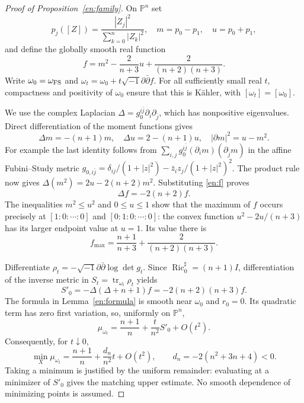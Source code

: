 \documentclass[12pt]{amsart}
\theoremstyle{definition}
\theoremstyle{remark}
\numberwithin{equation}{section}
\DeclareMathOperator{\Ric}{Ric}
\DeclareMathOperator{\tr}{tr}
\theoremstyle{plain}
\theoremstyle{remark}
\theoremstyle{definition}
\begin{document}
\begin{proof}[Proof of Proposition~\ref{en:family}]
On $\mathbb P^n$ set
\[
 p_j([Z])=\frac{|Z_j|^2}{\sum_{k=0}^n|Z_k|^2},\quad
 m=p_0-p_1,\quad u=p_0+p_1,
\]
and define the globally smooth real function
\begin{equation}\label{en:f}
 f=m^2-\frac2{n+3}u+\frac2{(n+2)(n+3)}.
\end{equation}
Write $\omega_0=\omega_{\rm FS}$ and
$\omega_t=\omega_0+t\sqrt{-1}\partial\bar\partial f$.
For all sufficiently small real $t$, compactness and positivity of
$\omega_0$ ensure that this is K\"ahler, with $[\omega_t]=[\omega_0]$.

We use the complex Laplacian $\Delta=g_0^{i\bar j}\partial_i\partial_{\bar j}$,
which has nonpositive eigenvalues. Direct differentiation of the moment
functions gives
\[
 \Delta m=-(n+1)m,\quad \Delta u=2-(n+1)u,
 \quad |\partial m|^2=u-m^2.
\]
For example the last identity follows from
$\sum_{i,j}g_0^{i\bar j}(\partial_i m)(\partial_{\bar j}m)$
in the affine Fubini--Study metric
$g_{0,i\bar j}=\delta_{ij}/(1+|z|^2)-\bar z_i z_j/(1+|z|^2)^2$.
The product rule now gives
$\Delta(m^2)=2u-2(n+2)m^2$. Substituting \eqref{en:f} proves
\begin{equation}\label{en:eigenfunction}
 \Delta f=-2(n+2)f.
\end{equation}
The inequalities $m^2\leq u^2$ and $0\leq u\leq1$ show that the maximum
of $f$ occurs precisely at $[1:0:\cdots:0]$ and $[0:1:0:\cdots:0]$:
the convex function $u^2-2u/(n+3)$ has its larger endpoint value at $u=1$.
Its value there is
\[
 f_{\max}=\frac{n+1}{n+3}+\frac2{(n+2)(n+3)}.
\]

Differentiate $\rho_t=-\sqrt{-1}\partial\bar\partial\log\det g_t$.
Since $\Ric^\sharp_0=(n+1)I$, differentiation of the inverse metric in
$S_t=\tr_{\omega_t}\rho_t$ yields
\begin{equation}\label{en:variation}
 S'_0=-\Delta(\Delta+n+1)f
     =-2(n+2)(n+3)f.
\end{equation}
The formula in Lemma~\ref{en:formula} is smooth near $\omega_0$ and
$r_0=0$. Its quadratic term has zero first variation, so, uniformly on
$\mathbb P^n$,
\begin{equation}\label{en:muvariation}
 \mu_{\omega_t}=\frac{n+1}{n}+\frac{t}{n^2}S'_0+O(t^2).
\end{equation}
Consequently, for $t\downarrow0$,
\[
 \min_X\mu_{\omega_t}=\frac{n+1}{n}+\frac{d_n}{n^2}t+O(t^2),
 \qquad d_n=-2(n^2+3n+4)<0.
\]
Taking a minimum is justified by the uniform remainder: evaluating at
a minimizer of $S'_0$ gives the matching upper estimate. No smooth
dependence of minimizing points is assumed.


\end{proof}
\end{document}
